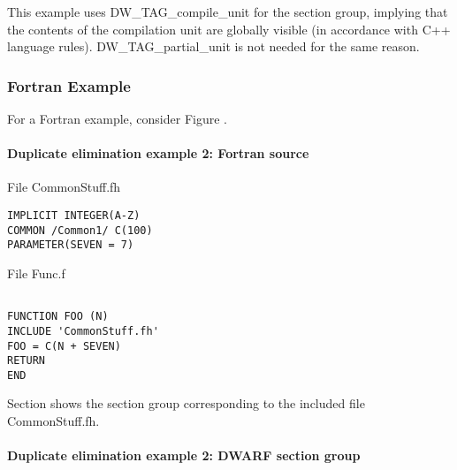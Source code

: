 This example uses DW\_TAG\_compile\_unit for the section group,
implying that the contents of the compilation unit are
globally visible (in accordance with C++ language rules).
DW\_TAG\_partial\_unit is not needed for the same reason.

\subsubsection{Fortran Example}


For a Fortran example, consider 
Figure .


\paragraph{Duplicate elimination example 2: Fortran source} 
\label{app:duplicateeliminationexample2fortransource}

File CommonStuff.fh

\begin{lstlisting}
IMPLICIT INTEGER(A-Z)
COMMON /Common1/ C(100)
PARAMETER(SEVEN = 7)
\end{lstlisting}

File Func.f
\begin{lstlisting}

FUNCTION FOO (N)
INCLUDE 'CommonStuff.fh'
FOO = C(N + SEVEN)
RETURN
END
\end{lstlisting}


Section 
shows the section group 
corresponding to the included file CommonStuff.fh.

\paragraph{Duplicate elimination example 2: DWARF section group}
\label{app:duplicateeliminationexample2dwarfsectiongroup}

